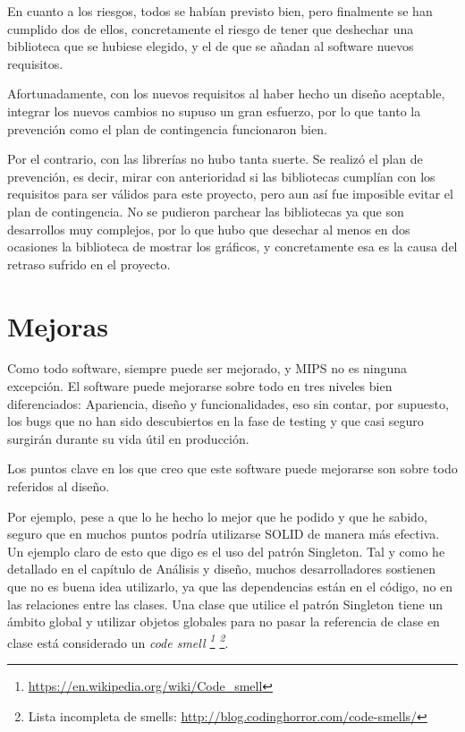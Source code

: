 En cuanto a los riesgos, todos se hab\'ian previsto bien, pero finalmente se han cumplido dos
de ellos, concretamente el riesgo de tener que deshechar una biblioteca que se hubiese elegido,
y el de que se a\~nadan al software nuevos requisitos.

Afortunadamente, con los nuevos requisitos al haber hecho un dise\~no 
aceptable, integrar los nuevos cambios no supuso un gran esfuerzo, por lo que 
tanto la prevenci\'on como el plan de contingencia funcionaron bien.

Por el contrario, con las librer\'ias no hubo tanta suerte. Se realiz\'o el 
plan de prevenci\'on, es decir, mirar con anterioridad si las bibliotecas 
cumpl\'ian con los requisitos para ser v\'alidos para este proyecto, pero aun 
as\'i fue imposible evitar el plan de contingencia. No se pudieron parchear las 
bibliotecas ya que son desarrollos muy complejos, por lo que hubo que desechar 
al menos en dos ocasiones la biblioteca de mostrar los gr\'aficos, y 
concretamente esa es la causa del retraso sufrido en el proyecto.

\section{Mejoras}
Como todo software, siempre puede ser mejorado, y MIPS no es ninguna 
excepci\'on. El software puede mejorarse sobre todo en tres niveles bien 
diferenciados: Apariencia, dise\~no y funcionalidades, eso sin contar, por
supuesto, los bugs que no han sido descubiertos en la fase de testing y que
casi seguro surgir\'an durante su vida \'util en producci\'on.

Los puntos clave en los que creo que este software puede mejorarse son sobre 
todo referidos al dise\~no.

Por ejemplo, pese a que lo he hecho lo mejor que he podido y que he sabido,
seguro que en muchos puntos podr\'ia utilizarse SOLID de manera m\'as efectiva. 
Un ejemplo claro de esto que digo es el uso del patr\'on Singleton. Tal y como 
he detallado en el cap\'itulo de An\'alisis y dise\~no, muchos desarrolladores 
sostienen que no es buena idea utilizarlo, ya que las dependencias est\'an en 
el c\'odigo, no en las relaciones entre las clases. Una clase que utilice el 
patr\'on Singleton tiene un \'ambito global y utilizar objetos globales para
no pasar la referencia de clase en clase est\'a considerado un 
\emph{code smell \footnote{\url{https://en.wikipedia.org/wiki/Code_smell}}
    \footnote{Lista incompleta de smells: \url{http://blog.codinghorror.com/code-smells/}}}.


